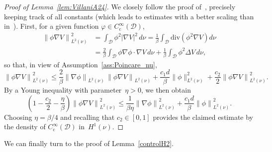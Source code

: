 \documentclass[10pt]{amsart}
\theoremstyle{definition}\newtheorem{defi}[theo]{Definition}\newtheorem{rema}[theo]{Remark}\newtheorem{exam}[theo]{Example}\newtheorem{exem}[theo]{Example}\newtheorem{nota}[theo]{Notation}
\newcommand{\rmc}{\mathrm{c}}
\newcommand{\divl}{\mathrm{div}}
\newcommand{\cD}{\mathcal{D}}
\renewcommand{\leq}{\leqslant}
\begin{document}
\begin{proof}[Proof of Lemma~\ref{lem:VillaniA24}]
We closely follow the proof of~\cite[Lemma~A.24]{Villani09}, precisely keeping track of all constants (which leads to estimates with a better scaling than in~\cite[Lemma~2.2]{CLW19}). First, for a given function $\varphi \in C_\rmc^\infty(\cD)$,
\begin{align*}
\left\|\phi \nabla V \right\|^2_{L^2(\nu)} & = \int_\cD \phi^2 |\nabla V|^2 \, d\nu = \frac1\beta \int_\cD \divl\left(\phi^2 \nabla V\right) d\nu \\
& = \frac{2}{\beta} \int_\cD \phi \nabla \phi \cdot \nabla V \, d\nu + \frac{1}{\beta}\int_\cD \phi^2 \Delta V \, d\nu,
\end{align*}
so that, in view of Assumption~\ref{ass:Poincare_nu},
\[
\left\| \phi \nabla V\right\|^2_{L^2(\nu)} \leq \frac{2}{\beta} \left\|\nabla \phi\right\|_{L^2(\nu)} \, \left\| \phi \nabla V\right\|_{L^2(\nu)} + \frac{c_1 d}{\beta} \| \phi\|_{L^2(\nu)}^2 + \frac{c_2}{2} \left\|\phi \nabla V\right\|_{L^2(\nu)}^2.
\]
By a Young inequality with parameter~$\eta>0$, we then obtain
\[
\left(1-\frac{c_2}{2}-\frac{\eta}{\beta}\right)\left\| \phi \nabla V\right\|^2_{L^2(\nu)} \leq \frac{1}{\beta \eta} \left\|\nabla \phi\right\|^2_{L^2(\nu)} + \frac{c_1 d}{\beta} \left\| \phi \right\|_{L^2(\nu)}^2.
\]
Choosing $\eta = \beta/4$ and recalling that $c_2 \in [0,1]$ provides the claimed estimate by the density of $C_\rmc^\infty(\cD)$ in~$H^1(\nu)$.
\end{proof}

We can finally turn to the proof of Lemma~\ref{controlH2}.
\end{document}
